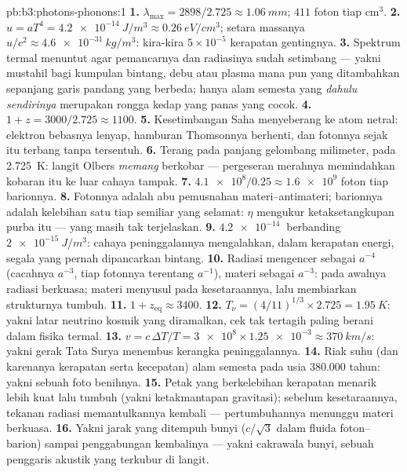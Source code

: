 \begin{solution}{pb:b3:photons-phonons:1}
\textbf{1.} $\lambda_{\max} = 2898/2.725 \approx \qty{1.06}{mm}$;
$411$ foton tiap cm$^3$.
\textbf{2.} $u = aT^4 = \qty{4.2e-14}{J/m^3} \approx
\qty{0.26}{eV/cm^3}$; setara massanya $u/c^2 \approx
\qty{4.6e-31}{kg/m^3}$: kira-kira $5\times10^{-5}$ kerapatan gentingnya.
\textbf{3.} Spektrum termal menuntut agar pemancarnya dan radiasinya
sudah setimbang --- yakni mustahil bagi kumpulan bintang, debu atau
plasma mana pun yang ditambahkan sepanjang garis pandang yang berbeda;
hanya alam semesta yang \emph{dahulu sendirinya} merupakan rongga kedap
yang panas yang cocok.
\textbf{4.} $1 + z = 3000/2.725 \approx 1100$.
\textbf{5.} Kesetimbangan Saha menyeberang ke atom netral: elektron
bebasnya lenyap, hamburan Thomsonnya berhenti, dan fotonnya sejak itu
terbang tanpa tersentuh.
\textbf{6.} Terang pada panjang gelombang milimeter, pada
\qty{2.725}{K}: langit Olbers \emph{memang} berkobar --- pergeseran
merahnya memindahkan kobaran itu ke luar cahaya tampak.
\textbf{7.} $\num{4.1e8}/0.25 \approx \num{1.6e9}$ foton tiap
barionnya.
\textbf{8.} Fotonnya adalah abu pemusnahan materi--antimateri;
barionnya adalah kelebihan satu tiap semiliar yang selamat: $\eta$
mengukur ketaksetangkupan purba itu --- yang masih tak terjelaskan.
\textbf{9.} $\qty{4.2e-14}{}$ berbanding $\qty{2e-15}{J/m^3}$: cahaya
peninggalannya mengalahkan, dalam kerapatan energi, segala yang pernah
dipancarkan bintang.
\textbf{10.} Radiasi mengencer sebagai $a^{-4}$ (cacahnya $a^{-3}$,
tiap fotonnya terentang $a^{-1}$), materi sebagai $a^{-3}$: pada
awalnya radiasi berkuasa; materi menyusul pada kesetaraannya, lalu
membiarkan strukturnya tumbuh.
\textbf{11.} $1 + z_{\text{eq}} \approx 3400$.
\textbf{12.} $T_\nu = (4/11)^{1/3} \times 2.725 =
\qty{1.95}{K}$: yakni latar neutrino kosmik yang diramalkan, cek
tak tertagih paling berani dalam fisika termal.
\textbf{13.} $v = c\,\Delta T/T = \num{3e8} \times \num{1.25e-3}
\approx \qty{370}{km/s}$: yakni gerak Tata Surya menembus kerangka
peninggalannya.
\textbf{14.} Riak suhu (dan karenanya kerapatan serta kecepatan)
alam semesta pada usia 380.000 tahun: yakni sebuah foto benihnya.
\textbf{15.} Petak yang berkelebihan kerapatan menarik lebih kuat lalu
tumbuh (yakni ketakmantapan gravitasi); sebelum kesetaraannya, tekanan
radiasi memantulkannya kembali --- pertumbuhannya menunggu materi
berkuasa.
\textbf{16.} Yakni jarak yang ditempuh bunyi ($c/\sqrt3$ dalam fluida
foton--barion) sampai penggabungan kembalinya --- yakni cakrawala bunyi,
sebuah penggaris akustik yang terkubur di langit.

\end{solution}
